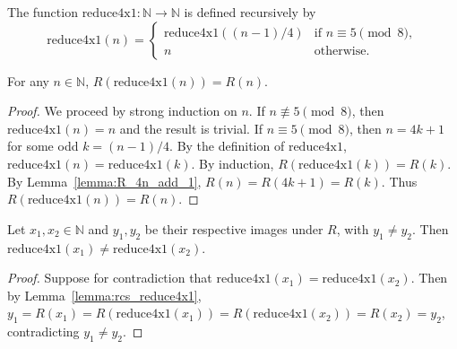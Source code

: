 \begin{definition}\label{def:reduce4x1}\leanok
The function $\text{reduce4x1}: \mathbb{N} \to \mathbb{N}$ is defined recursively by
\[ \text{reduce4x1}(n) = \begin{cases} \text{reduce4x1}((n-1)/4) & \text{if } n \equiv 5 \pmod{8}, \\ n & \text{otherwise.} \end{cases} \]
\end{definition}

\begin{lemma}\label{lemma:rcs_reduce4x1}\leanok
For any $n \in \mathbb{N}$, $R(\text{reduce4x1}(n)) = R(n)$.
\end{lemma}
\begin{proof}\leanok
We proceed by strong induction on $n$. If $n \not\equiv 5 \pmod{8}$, then $\text{reduce4x1}(n) = n$ and the result is trivial.
If $n \equiv 5 \pmod{8}$, then $n = 4k+1$ for some odd $k = (n-1)/4$.
By the definition of $\text{reduce4x1}$, $\text{reduce4x1}(n) = \text{reduce4x1}(k)$.
By induction, $R(\text{reduce4x1}(k)) = R(k)$.
By Lemma~\ref{lemma:R_4n_add_1}, $R(n) = R(4k+1) = R(k)$.
Thus $R(\text{reduce4x1}(n)) = R(n)$.
\end{proof}

\begin{lemma}\label{lemma:primitives_from_distinct_generators_ne}\leanok
Let $x_1, x_2 \in \mathbb{N}$ and $y_1, y_2$ be their respective images under $R$, with $y_1 \neq y_2$. Then $\text{reduce4x1}(x_1) \neq \text{reduce4x1}(x_2)$.
\end{lemma}
\begin{proof}\leanok
Suppose for contradiction that $\text{reduce4x1}(x_1) = \text{reduce4x1}(x_2)$.
Then by Lemma~\ref{lemma:rcs_reduce4x1},
$y_1 = R(x_1) = R(\text{reduce4x1}(x_1)) = R(\text{reduce4x1}(x_2)) = R(x_2) = y_2$,
contradicting $y_1 \neq y_2$.
\end{proof}

